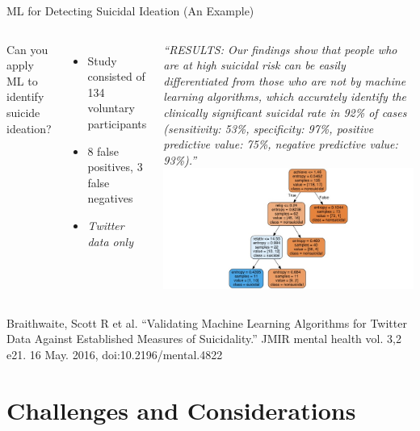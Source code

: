 \documentclass[nobackground,dvipsnames,table,aspectratio=169]{beamer}
\begin{document}
\begin{frame}{ML for Detecting Suicidal Ideation (An Example)}
    \begin{columns}
            \small
            Can you apply ML to identify suicide ideation?
            \begin{itemize}
                \small
                \item Study consisted of 134 voluntary participants
                \item 8 false positives, 3 false negatives
                \item \textit{Twitter data only}
            \end{itemize}
            \vspace{0.05\textheight}
            \tiny
            \textit{“RESULTS: Our findings show that people who are at high suicidal risk can be easily differentiated from those who are not by machine learning algorithms, which accurately identify the clinically significant suicidal rate in 92\% of cases (sensitivity: 53\%, specificity: 97\%, positive predictive value: 75\%, negative predictive value: 93\%).”}
            \includegraphics[width=\textwidth]{ml-identification}
    \end{columns}
    \vspace{0.02\textheight}
    \tiny
    Braithwaite, Scott R et al. “Validating Machine Learning Algorithms for Twitter Data Against Established Measures of Suicidality.” JMIR mental health vol. 3,2 e21. 16 May. 2016, doi:10.2196/mental.4822
\end{frame}

\section{Challenges and Considerations}
\end{document}
